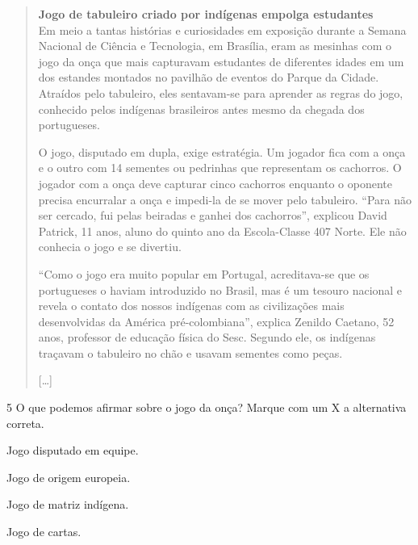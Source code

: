 \begin{quote}
\textbf{Jogo de tabuleiro criado por indígenas empolga estudantes}\\
Em meio a tantas histórias e curiosidades em exposição durante a Semana
Nacional de Ciência e Tecnologia, em Brasília, eram as mesinhas com o
jogo da onça que mais capturavam estudantes de diferentes idades em um
dos estandes montados no pavilhão de eventos do Parque da Cidade.
Atraídos pelo tabuleiro, eles sentavam-se para aprender as regras do
jogo, conhecido pelos indígenas brasileiros antes mesmo da chegada dos
portugueses.

O jogo, disputado em dupla, exige estratégia. Um jogador fica com a onça
e o outro com 14 sementes ou pedrinhas que representam os cachorros. O
jogador com a onça deve capturar cinco cachorros enquanto o oponente
precisa encurralar a onça e impedi-la de se mover pelo tabuleiro. “Para
não ser cercado, fui pelas beiradas e ganhei dos cachorros”, explicou
David Patrick, 11 anos, aluno do quinto ano da Escola-Classe 407 Norte.
Ele não conhecia o jogo e se divertiu.

“Como o jogo era muito popular em Portugal, acreditava-se que os
portugueses o haviam introduzido no Brasil, mas é um tesouro nacional e
revela o contato dos nossos indígenas com as civilizações mais
desenvolvidas da América pré-colombiana”, explica Zenildo Caetano, 52
anos, professor de educação física do Sesc. Segundo ele, os indígenas
traçavam o tabuleiro no chão e usavam sementes como peças.

{[}\ldots{}{]}

\end{quote}

\num{5} O que podemos afirmar sobre o jogo da onça? Marque com um X a alternativa correta.

\begin{boxlist}
 Jogo disputado em equipe.

 Jogo de origem europeia.

 Jogo de matriz indígena.

 Jogo de cartas.
\end{boxlist}



